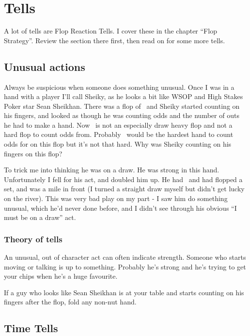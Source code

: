 \chapter{Tells}


A lot of tells are Flop Reaction Tells. I cover these in
the chapter ``Flop Strategy''. Review the section there first, then
read on for some more tells.

\section{Unusual actions}

Always be suspicious when someone does something unusual.
Once I was in a hand with a player I'll call Sheiky, as
he looks a bit like WSOP and High Stakes Poker star Sean Sheikhan.
There was a flop of \Kc\nined\sevd\, and Sheiky started counting on his
fingers, and looked as though he was counting odds and the number
of outs he had to make a hand. Now \Kc\nined\sevd\ is not an especially
draw heavy flop and not a hard flop to count odds from. Probably \Qd\tens\ would
be the hardest hand to count odds for on this flop but it's not
that hard. Why was Sheiky counting on his fingers on this flop?

To trick me into thinking he was on a draw. He was strong in
this hand. Unfortunately I fell for his act, and doubled him up.
He had \ninec\nineh\, and had flopped a set, and was a mile in front (I turned
a straight draw myself but didn't get lucky on the river). This
was very bad play on my part - I saw him do something unusual, which
he'd never done before, and I didn't see through his obvious
``I must be on a draw'' act.

\subsection{Theory of tells}

An unusual, out of character act can often indicate
strength. Someone who starts moving or talking is up to something.
Probably he's strong and he's trying to get your chips when he's
a huge favourite.

If a guy who looks like Sean Sheikhan is at
your table and starts counting on his fingers after the flop, fold any
non-nut hand.

\section{Time Tells}

